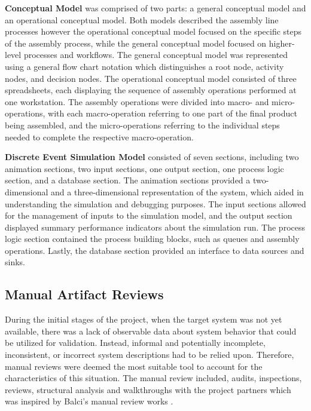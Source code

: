 \documentclass{llncs}
\begin{document}
    \textbf{Conceptual Model} was comprised of two parts: a general conceptual model and an operational conceptual model. 
    Both models described the assembly line processes however the operational conceptual model focused on the specific steps of the assembly process, while the general conceptual model focused on higher-level processes and workflows.
    The general conceptual model was represented using a general flow chart notation which distinguishes a root node, activity nodes, and decision nodes.
    The operational conceptual model consisted of three spreadsheets, each displaying the sequence of assembly operations performed at one workstation. 
    The assembly operations were divided into macro- and micro-operations, with each macro-operation referring 
    to one part of the final product being assembled, and the micro-operations referring to the individual steps needed to complete the respective macro-operation.

    \textbf{Discrete Event Simulation Model} consisted of seven sections, including two animation sections, two input sections, one output section, one process logic section, and a database section. 
    The animation sections provided a two-dimensional and a three-dimensional representation of the system, 
    which aided in understanding the simulation and debugging purposes. The input sections allowed for the management of inputs to the simulation model, and the output section displayed summary performance indicators about the simulation run. 
    The process logic section contained the process building blocks, such as queues and assembly operations. Lastly, the database section provided an interface to data sources and sinks.
    
    \subsection{Manual Artifact Reviews}
    During the initial stages of the project, when the target system was not yet available,
    there was a lack of observable data about system behavior that could be utilized for validation. 
    Instead, informal and potentially incomplete, inconsistent, or incorrect system descriptions had to be relied upon. 
    Therefore, manual reviews were deemed the most suitable tool to account for the characteristics of this situation.
    The manual review included, audits, inspections, reviews, structural analysis and walkthroughs 
    with the project partners which was inspired by Balci's manual review works \cite{balcitechniques}. 
    
\end{document}
